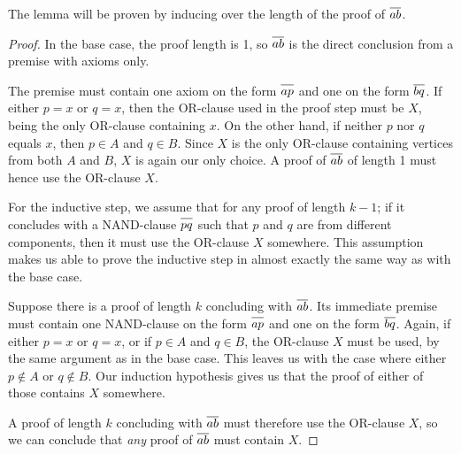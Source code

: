 The lemma will be proven by inducing over the length of the proof of $\ol{ab}$.
\begin{proof}
  In the base case, the proof length is 1, so $\ol{ab}$ is the direct conclusion from a premise with axioms only.\par
  \begin{figure}[!h]
    \centering
    \begin{prooftree*}
      \Hypo{\dots}
    \end{prooftree*}
    \caption{}
    \label{fig:ab_proof_bc}
  \end{figure}
  The premise must contain one axiom on the form $\ol{ap}$ and one on the form $\ol{bq}$.
  If either $p = x$ or $q = x$, then the OR-clause used in the proof step must be $X$, being the only OR-clause containing $x$.
  On the other hand, if neither $p$ nor $q$ equals $x$, then $p \in A$ and $q \in B$.
  Since $X$ is the only OR-clause containing vertices from both $A$ and $B$, $X$ is again our only choice.
  A proof of $\ol{ab}$ of length 1 must hence use the OR-clause $X$.

  For the inductive step, we assume that for any proof of length $k-1$; if it concludes with a NAND-clause $\ol{pq}$ such that $p$ and $q$ are from different components, then it must use the OR-clause $X$ somewhere.
  This assumption makes us able to prove the inductive step in almost exactly the same way as with the base case.

  Suppose there is a proof of length $k$ concluding with $\ol{ab}$.
  Its immediate premise must contain one NAND-clause on the form $\ol{ap}$ and one on the form $\ol{bq}$.
  Again, if either $p=x$ or $q=x$, or if $p \in A$ and $q \in B$, the OR-clause $X$ must be used, by the same argument as in the base case.
  This leaves us with the case where either $p \not\in A$ or $q \not\in B$.
  Our induction hypothesis gives us that the proof of either of those contains $X$ somewhere.

  A proof of length $k$ concluding with $\ol{ab}$ must therefore use the OR-clause $X$, so we can conclude that \textit{any} proof of $\ol{ab}$ must contain $X$.
\end{proof}
\pagebreak
